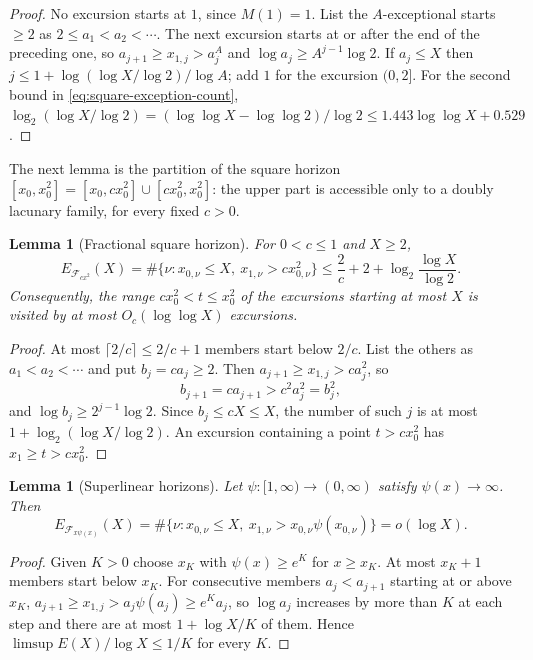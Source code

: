 \documentclass[11pt]{amsart}
\numberwithin{equation}{section}
\theoremstyle{plain}
\newtheorem{lemma}[theorem]{Lemma}
\theoremstyle{definition}
\theoremstyle{remark}
\newcommand{\F}{\mathcal{F}}
\begin{document}
\begin{proof}
No excursion starts at $1$, since $M(1)=1$. List the $A$-exceptional starts
$\ge2$ as $2\le a_1<a_2<\cdots$. The next excursion starts at or after the
end of the preceding one, so $a_{j+1}\ge x_{1,j}>a_j^A$ and
$\log a_j\ge A^{j-1}\log2$. If $a_j\le X$ then
$j\le1+\log(\log X/\log2)/\log A$; add $1$ for the excursion $(0,2]$. For the
second bound in \eqref{eq:square-exception-count},
$\log_2(\log X/\log2)=(\log\log X-\log\log2)/\log2\le1.443\log\log X+0.529$.
\end{proof}

The next lemma is the partition of the square horizon
$[x_0,x_0^2]=[x_0,cx_0^2]\cup[cx_0^2,x_0^2]$: the upper part is accessible
only to a doubly lacunary family, for every fixed $c>0$.

\begin{lemma}[Fractional square horizon]
\label{lem:partition}
For $0<c\le1$ and $X\ge2$,
\begin{equation}
\label{eq:partition-count}
E_{\F_{cx^2}}(X)=\#\{\nu:x_{0,\nu}\le X,\ x_{1,\nu}>cx_{0,\nu}^2\}
\le\frac2c+2+\log_2\frac{\log X}{\log2}.
\end{equation}
Consequently, the range $cx_0^2<t\le x_0^2$ of the excursions starting at
most $X$ is visited by at most $O_c(\log\log X)$ excursions.
\end{lemma}

\begin{proof}
At most $\lceil2/c\rceil\le2/c+1$ members start below $2/c$. List the others
as $a_1<a_2<\cdots$ and put $b_j=ca_j\ge2$. Then
$a_{j+1}\ge x_{1,j}>ca_j^2$, so
\[
b_{j+1}=ca_{j+1}>c^2a_j^2=b_j^2,
\]
and $\log b_j\ge2^{j-1}\log2$. Since $b_j\le cX\le X$, the number of such
$j$ is at most $1+\log_2(\log X/\log2)$. An excursion containing a point
$t>cx_0^2$ has $x_1\ge t>cx_0^2$.
\end{proof}

\begin{lemma}[Superlinear horizons]
\label{lem:superlinear}
Let $\psi:[1,\infty)\to(0,\infty)$ satisfy $\psi(x)\to\infty$. Then
\[
E_{\F_{x\psi(x)}}(X)
=\#\{\nu:x_{0,\nu}\le X,\ x_{1,\nu}>x_{0,\nu}\psi(x_{0,\nu})\}
=o(\log X).
\]
\end{lemma}

\begin{proof}
Given $K>0$ choose $x_K$ with $\psi(x)\ge e^K$ for $x\ge x_K$. At most
$x_K+1$ members start below $x_K$. For consecutive members
$a_j<a_{j+1}$ starting at or above $x_K$,
$a_{j+1}\ge x_{1,j}>a_j\psi(a_j)\ge e^Ka_j$, so $\log a_j$ increases by more
than $K$ at each step and there are at most $1+\log X/K$ of them. Hence
$\limsup E(X)/\log X\le1/K$ for every $K$.
\end{proof}
\end{document}
